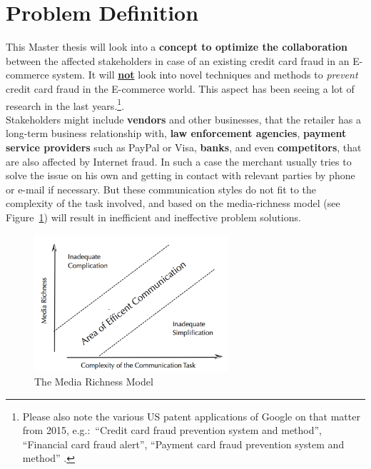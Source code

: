 
\section{Problem Definition}
\label{sec:problem_definition}

This Master thesis will look into a \textbf{concept to optimize the collaboration} between the affected stakeholders in case of an existing credit card fraud in an E-commerce system. It will \textbf{\underline{not}} look into novel techniques and methods to \textit{prevent} credit card fraud in the E-commerce world. This aspect has been seeing a lot of research in the last years.\footnote{Please also note the various US patent applications of Google on that matter from 2015, e.g.:\ “Credit card fraud prevention system and method”, “Financial card fraud alert”, “Payment card fraud prevention system and method” \citep{GooglePatents2015}.}. \\

Stakeholders might include \textbf{vendors} and other businesses, that the retailer has a long-term business relationship with, \textbf{law enforcement agencies}, \textbf{payment service providers} such as PayPal or Visa, \textbf{banks}, and even \textbf{competitors}, that are also affected by  Internet fraud. In such a case the merchant usually tries to solve the issue on his own and getting in contact with relevant parties by phone or e-mail if necessary. But these communication styles do not fit to the complexity of the task involved, and based on the media-richness model (see Figure~\ref{fig:images_media_richness_model}) will result in inefficient and ineffective problem solutions. \\

\begin{figure}[!ht]
	\centering
		\includegraphics[height=2in]{images/media-richness-model.png}
	\caption{The Media Richness Model \citep{Rice1992}}
\label{fig:images_media_richness_model}
\end{figure}

